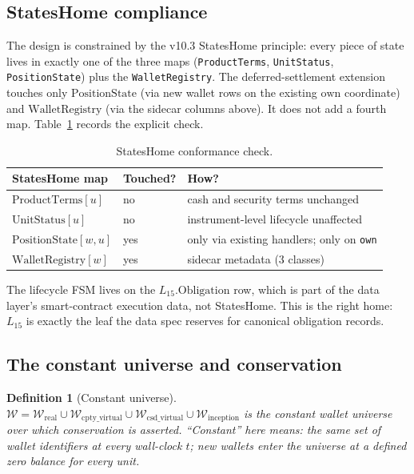 \documentclass[11pt,a4paper]{article}
\newtheorem{definition}{Definition}[section]
\begin{document}
\subsection{StatesHome compliance}

The design is constrained by the v10.3 StatesHome principle: every piece of state lives in exactly one of the three maps (\texttt{ProductTerms}, \texttt{UnitStatus}, \texttt{PositionState}) plus the \texttt{WalletRegistry}. The deferred-settlement extension touches only $\mathrm{PositionState}$ (via new wallet rows on the existing $\mathrm{own}$ coordinate) and $\mathrm{WalletRegistry}$ (via the sidecar columns above). It does not add a fourth map. Table~\ref{tab:stateshome} records the explicit check.

\begin{table}[h]
\centering
\begin{tabular}{lll}
\toprule
\textbf{StatesHome map} & \textbf{Touched?} & \textbf{How?} \\
\midrule
$\mathrm{ProductTerms}[u]$       & no  & cash and security terms unchanged \\
$\mathrm{UnitStatus}[u]$         & no  & instrument-level lifecycle unaffected \\
$\mathrm{PositionState}[w, u]$   & yes & only via existing handlers; only on \texttt{own} \\
$\mathrm{WalletRegistry}[w]$     & yes & sidecar metadata (3 classes) \\
\bottomrule
\end{tabular}
\caption{StatesHome conformance check.}
\label{tab:stateshome}
\end{table}

The lifecycle FSM lives on the $L_{15}.\mathrm{Obligation}$ row, which is part of the data layer's smart-contract execution data, not StatesHome. This is the right home: $L_{15}$ is exactly the leaf the data spec reserves for canonical obligation records.

\subsection{The constant universe and conservation}

\begin{definition}[Constant universe]
\label{def:universe}
$\mathcal{W} = \mathcal{W}_{\mathrm{real}} \cup \mathcal{W}_{\mathrm{cpty\_virtual}} \cup \mathcal{W}_{\mathrm{csd\_virtual}} \cup \mathcal{W}_{\mathrm{inception}}$ is the \emph{constant} wallet universe over which conservation is asserted. ``Constant'' here means: the same set of wallet identifiers at every wall-clock $t$; new wallets enter the universe at a defined zero balance for every unit.
\end{definition}
\end{document}
